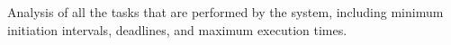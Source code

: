 \documentclass[main.tex]{subfiles}
\begin{document}
Analysis of all the tasks that are performed by the system, including minimum initiation intervals, deadlines, and maximum execution times.
\end{document}
